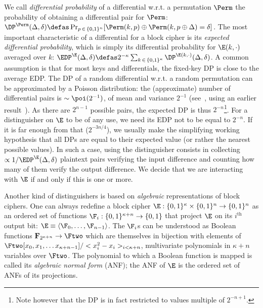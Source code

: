 We call \emph{differential probability} of a differential w.r.t. a permutation $\Perm$ the probability of obtaining a differential pair
for $\Perm$:
$\DP^{\Perm}(\Delta,\delta) \defas \Pr_{p\,\in\,\{0,1\}^n}[\Perm(k,p) \oplus \Perm(k,p \oplus \Delta) = \delta]$.
The most important characteristic of a differential for a block cipher is its \emph{expected differential probability}, which
is simply its differential probability for $\E(k,\cdot)$ averaged over $k$:
$\EDP^{\E}(\Delta,\delta) \defas 2^{-\kappa}\sum_{k\,\in\,\{0,1\}^\kappa} \DP^{\E(k,\cdot)}(\Delta,\delta)$.
A common assumption is that for most keys and differentials, the fixed-key DP is close to the average EDP.
The DP of a random differential w.r.t. a random permutation can be approximated by
a Poisson distribution: the (approximate) number of differential pairs is $\sim \poi(2^{-1})$, of mean and variance $2^{-1}$
(see~\cite{DBLP:journals/jmc/DaemenR07}, using an earlier result~\cite{DBLP:journals/joc/OConnor95}).
As there are $2^{n-1}$ possible pairs, the expected DP is thus $2^{-n}$\footnote{Note however that the DP is in fact restricted to values multiple of $2^{-n+1}$.}.
For a distinguisher on $\E$ to be of any use, we need its EDP not to be equal to $2^{-n}$. If it is far enough
from that (\eg $2^{-3n/4}$), we usually make the simplifying working hypothesis that all DPs are equal to their expected value (or rather the nearest
possible values).
In such a case, using the distinguisher consists in collecting $\propto 1/\EDP^{\E}(\Delta,\delta)$ plaintext pairs verifying
the input difference and counting how many of them verify the output difference. We decide that we are interacting with $\E$ if and only if this is one or more.

\bigskip

Another kind of distinguishers is based on \emph{algebraic} representations of block ciphers. One can always redefine a block cipher
$\E : \{0,1\}^\kappa \times \{0,1\}^n \rightarrow \{0,1\}^n$ as an ordered set of functions $\F_i : \{0,1\}^{\kappa+n} \rightarrow \{0,1\}$ that project
$\E$ on its $i^\text{th}$ output bit: $\E \equiv \langle \F_0, \ldots, \F_{n-1} \rangle$. The $\F_i$s can be understood as Boolean functions
$\mathbf{F}_{2^{\kappa + n}} \rightarrow \Ftwo$ which are themselves in bijection with elements of $\Ftwo[x_0,x_1,\ldots x_{\kappa + n-1}]/<x_i^2-x_i>_{i<\kappa + n}$,
\ie multivariate polynomials in $\kappa + n$ variables over $\Ftwo$. The polynomial to which a Boolean function is mapped is called its \emph{algebraic normal form} (ANF);
the ANF of $\E$ is the ordered set of ANFs of its projections.

